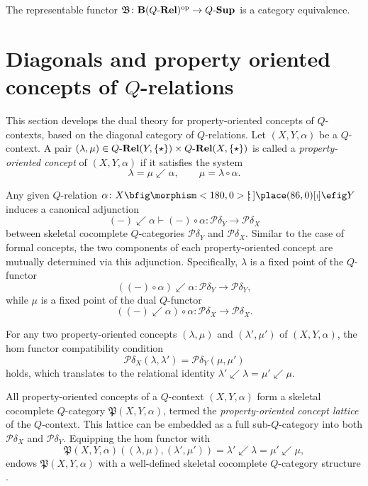 \documentclass{tac}
\begin{document}
\begin{proposition} \label{prop:b-equivalence}
The representable functor $\mathfrak{B}\colon\mathbf{B}(Q\text{-}\mathbf{Rel})^{\mathrm{op}}\to{Q\text{-}\mathbf{Sup}}$ is a category equivalence.
\end{proposition}



\section{Diagonals and property oriented concepts of $Q$-relations} \label{sec:diag}

This section develops the dual theory for property-oriented concepts of $Q$-contexts, based on the diagonal category of $Q$-relations. Let $(X,Y,\alpha)$ be a $Q$-context. A pair $(\lambda,\mu)\in Q\text{-}\mathbf{Rel}(Y,{\{\star\}})\times Q\text{-}\mathbf{Rel}(X,{\{\star\}})$ is called a \emph{property-oriented concept} \cite{Duntsch2002,Popescu2004,Yao2004} of $(X,Y,\alpha)$ if it satisfies the system
\[
\lambda=\mu\swarrow\alpha,\qquad \mu=\lambda\circ\alpha.
\]

Any given $Q$-relation $\alpha\colon X\nto Y$ induces a canonical adjunction
\[
(-)\swarrow\alpha\vdash(-)\circ\alpha\colon\mathcal{P}\delta_Y\to\mathcal{P}\delta_X
\]
between skeletal cocomplete $Q$-categories $\mathcal{P}\delta_Y$ and $\mathcal{P}\delta_X$. Similar to the case of formal concepts, the two components of each property-oriented concept are mutually determined via this adjunction. Specifically, $\lambda$ is a fixed point of the $Q$-functor $$((-)\circ\alpha)\swarrow\alpha\colon\mathcal{P}\delta_Y\to\mathcal{P}\delta_Y,$$
 while $\mu$ is a fixed point of the dual $Q$-functor $$((-)\swarrow\alpha)\circ\alpha\colon\mathcal{P}\delta_X\to\mathcal{P}\delta_X.$$

For any two property-oriented concepts $(\lambda,\mu)$ and $(\lambda',\mu')$ of $(X,Y,\alpha)$, the hom functor compatibility condition
\[
\mathcal{P}\delta_X(\lambda,\lambda')=\mathcal{P}\delta_Y(\mu,\mu')
\]
holds, which translates to the relational identity $\lambda'\swarrow\lambda=\mu'\swarrow\mu$.

All property-oriented concepts of a $Q$-context $(X,Y,\alpha)$ form a skeletal cocomplete $Q$-category $\mathfrak{P}(X,Y,\alpha)$, termed the \emph{property-oriented concept lattice} of the $Q$-context. This lattice can be embedded as a full sub-$Q$-category into both $\mathcal{P}\delta_X$ and $\mathcal{P}\delta_Y$. Equipping the hom functor with
\[
\mathfrak{P}(X,Y,\alpha)((\lambda,\mu),(\lambda',\mu'))=\lambda'\swarrow\lambda=\mu'\swarrow\mu,
\]
endows $\mathfrak{P}(X,Y,\alpha)$ with a well-defined skeletal cocomplete $Q$-category structure \cite{LaiZhang2009}.
\end{document}
